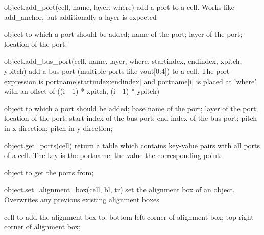 \begin{APIfunc}{object.add\_port(cell, name, layer, where)}
    add a port to a cell. Works like add\_anchor, but additionally a layer is expected
    \begin{APIparameters}
            object to which a port should be added;
            name of the port;
            layer of the port;
            location of the port;
    \end{APIparameters}
\end{APIfunc}
\begin{APIfunc}{object.add\_bus\_port(cell, name, layer, where, startindex, endindex, xpitch, ypitch)}
    add a bus port (multiple ports like vout[0:4]) to a cell. The port expression is portname[startindex:endindex] and portname[i] is placed at 'where' with an offset of ((i - 1) * xpitch, (i - 1) * ypitch)
    \begin{APIparameters}
            object to which a port should be added;
            base name of the port;
            layer of the port;
            location of the port;
            start index of the bus port;
            end index of the bus port;
            pitch in x direction;
            pitch in y direction;
    \end{APIparameters}
\end{APIfunc}
\begin{APIfunc}{object.get\_ports(cell)}
    return a table which contains key-value pairs with all ports of a cell. The key is the portname, the value the corresponding point.
    \begin{APIparameters}
            object to get the ports from;
    \end{APIparameters}
\end{APIfunc}
\begin{APIfunc}{object.set\_alignment\_box(cell, bl, tr)}
    set the alignment box of an object. Overwrites any previous existing alignment boxes
    \begin{APIparameters}
            cell to add the alignment box to;
            bottom-left corner of alignment box;
            top-right corner of alignment box;
    \end{APIparameters}
\end{APIfunc}

